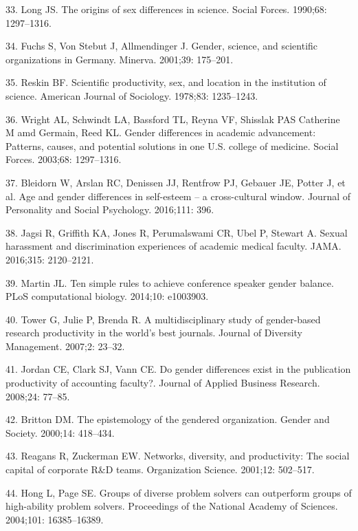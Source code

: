 \documentclass[12pt,]{article}
\begin{document}
\hypertarget{ref-Long_1990}{}
33. Long JS. The origins of sex differences in science. Social Forces.
1990;68: 1297--1316.

\hypertarget{ref-Fuchs_2001}{}
34. Fuchs S, Von Stebut J, Allmendinger J. Gender, science, and
scientific organizations in Germany. Minerva. 2001;39: 175--201.

\hypertarget{ref-Reskin_1978}{}
35. Reskin BF. Scientific productivity, sex, and location in the
institution of science. American Journal of Sociology. 1978;83:
1235--1243.

\hypertarget{ref-Wright_2003}{}
36. Wright AL, Schwindt LA, Bassford TL, Reyna VF, Shisslak PAS
Catherine M amd Germain, Reed KL. Gender differences in academic
advancement: Patterns, causes, and potential solutions in one U.S.
college of medicine. Social Forces. 2003;68: 1297--1316.

\hypertarget{ref-bleidorn2016age}{}
37. Bleidorn W, Arslan RC, Denissen JJ, Rentfrow PJ, Gebauer JE, Potter
J, et al. Age and gender differences in self-esteem -- a cross-cultural
window. Journal of Personality and Social Psychology. 2016;111: 396.

\hypertarget{ref-jagsi_2016}{}
38. Jagsi R, Griffith KA, Jones R, Perumalswami CR, Ubel P, Stewart A.
Sexual harassment and discrimination experiences of academic medical
faculty. JAMA. 2016;315: 2120--2121.

\hypertarget{ref-Martin_2014}{}
39. Martin JL. Ten simple rules to achieve conference speaker gender
balance. PLoS computational biology. 2014;10: e1003903.

\hypertarget{ref-Tower_2007}{}
40. Tower G, Julie P, Brenda R. A multidisciplinary study of
gender-based research productivity in the world's best journals. Journal
of Diversity Management. 2007;2: 23--32.

\hypertarget{ref-Jordan_2008}{}
41. Jordan CE, Clark SJ, Vann CE. Do gender differences exist in the
publication productivity of accounting faculty?. Journal of Applied
Business Research. 2008;24: 77--85.

\hypertarget{ref-Britton_2000}{}
42. Britton DM. The epistemology of the gendered organization. Gender
and Society. 2000;14: 418--434.

\hypertarget{ref-Reagans_2001}{}
43. Reagans R, Zuckerman EW. Networks, diversity, and productivity: The
social capital of corporate R\&D teams. Organization Science. 2001;12:
502--517.

\hypertarget{ref-Hong_2004}{}
44. Hong L, Page SE. Groups of diverse problem solvers can outperform
groups of high-ability problem solvers. Proceedings of the National
Academy of Sciences. 2004;101: 16385--16389.
\end{document}
